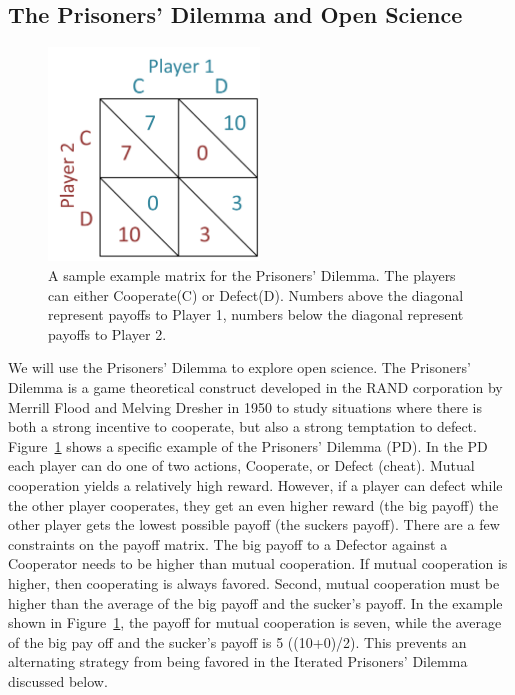 \documentclass[11pt]{article} %
\begin{document}
\subsection{The Prisoners' Dilemma and Open Science}
\begin{figure}[ht]
	\includegraphics[width=0.5\textwidth]{pdmatrix.png}
	\caption{A sample example matrix for the Prisoners' Dilemma. The players can either Cooperate(C) or Defect(D).  Numbers above the diagonal represent payoffs to Player 1, numbers below the diagonal represent payoffs to Player 2.}
	\label{pdmatrix}
\end{figure}
We will use the Prisoners' Dilemma to explore open science. The Prisoners' Dilemma is a game theoretical construct developed in the RAND corporation by Merrill Flood and Melving Dresher in 1950 \cite{ABAGFBEC19920101, unm.b196052419570101} to study situations where there is both a strong incentive to cooperate, but also a strong temptation to defect. Figure~\ref{pdmatrix} shows a specific example of the Prisoners' Dilemma (PD). In the PD each player can do one of two actions, Cooperate, or Defect (cheat). Mutual cooperation yields a relatively high reward. However, if a player can defect while the other player cooperates, they get an even higher reward (the big payoff) the other player gets the lowest possible payoff (the suckers payoff). There are a few constraints on the payoff matrix. The big payoff to a Defector against a Cooperator needs to be higher than mutual cooperation. If mutual cooperation is higher, then cooperating is always favored. Second, mutual cooperation must be higher than the average of the big payoff and the sucker's payoff. In the example shown in Figure~\ref{pdmatrix}, the payoff for mutual cooperation is seven, while the average of the big pay off and the sucker's payoff is 5 ((10+0)/2). This prevents an alternating strategy from being favored in the Iterated Prisoners' Dilemma discussed below.
\end{document}
